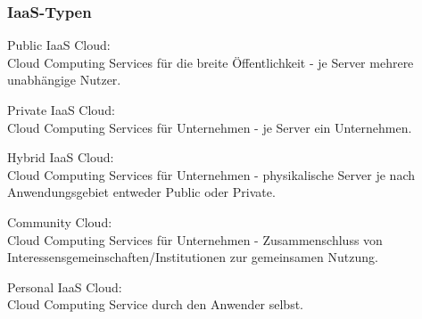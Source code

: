 \documentclass[12pt,a4paper,bibliography=totocnumbered,listof=totocnumbered]{scrartcl}
\begin{document}
\subsubsection{IaaS-Typen}
\begin{compactitem}
\item Public IaaS Cloud:\\
Cloud Computing Services für die breite Öffentlichkeit - je Server mehrere unabhängige Nutzer.
\item Private IaaS Cloud:\\
Cloud Computing Services für Unternehmen - je Server ein Unternehmen.
\item Hybrid IaaS Cloud:\\
Cloud Computing Services für Unternehmen - physikalische Server je nach Anwendungsgebiet entweder Public oder Private.
\item Community Cloud:\\
Cloud Computing Services für Unternehmen - Zusammenschluss von Interessensgemeinschaften/Institutionen zur gemeinsamen Nutzung.
\item Personal IaaS Cloud:\\
Cloud Computing Service durch den Anwender selbst.
\end{compactitem}
\pagebreak
\end{document}
